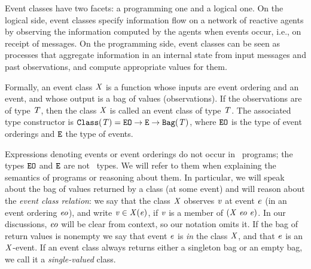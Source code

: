 \documentclass[final]{article}
\begin{document}
%
Event classes have two facets: a programming one and a logical one.
%
On the logical side, event classes specify information flow on a
network of reactive agents by observing the information computed by
the agents when events occur, i.e., on receipt of messages.
%
On the programming side, event classes can be seen as processes that
aggregate information in an internal state from input messages and
past observations, and compute appropriate values for them.
%
%

Formally, an event class $\METAeclass$ is a function whose inputs are
event ordering and an event, and whose output is a bag of values
(observations).  If the observations are of type $\NUPRL{T}$, then the
class $\METAeclass$ is called an event class of type $\NUPRL{T}$.  The
associated type constructor is
$\NUPRLclass{\NUPRL{T}}
=\NUPRLarrow
{\NUPRLeventordering}
{\NUPRLarrow
  {\NUPRLese}
  {\NUPRLbag{\NUPRL{T}}}
}$,
%
where $\NUPRLeventordering$ is the type of event orderings and
$\NUPRLese$ the type of events.
%

Expressions denoting events or event orderings do not occur in
\eml\ programs; the types $\NUPRLeventordering$ and $\NUPRLese$ are
not \eml\ types.  We will refer to them when explaining the semantics
of programs or reasoning about them.  In particular, we will speak
about the bag of values returned by a class (at some event) and will
reason about the \emph{event class relation}:%
%
%
%
we say that the class $\NUPRL{X}$ observes $\NUPRL{v}$ at event
$\NUPRLevent$ (in an event ordering $\NUPRLes$), and write
$\NUPRLclassrel{\NUPRLes}{\NUPRLevent}{\NUPRL{T}}{\NUPRL{X}}{\NUPRL{v}}$,
if $\NUPRL{v}$ is a member of
$(\NUPRLappclass{\NUPRL{X}}{\NUPRLes}{\NUPRLevent})$.  In our
discussions, $\NUPRLes$ will be clear from context, so our notation
omits it.
%
If the bag of return values is nonempty we say that event
$\NUPRLevent$ is \emph{in} the class $\METAeclass$, and that
$\NUPRLevent$ is an $\METAeclass$-event.  If an event class always
returns either a singleton bag or an empty bag, we call it a
\emph{single-valued}%
%
%
class.
\end{document}
